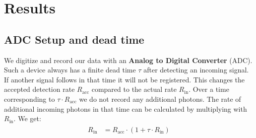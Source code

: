 \section*{Results}
%
\subsection*{ADC Setup and dead time}
%
We digitize and record our data with an \textbf{Analog to Digital Converter} (ADC).
Such a device always has a finite dead time $\tau$ after detecting an incoming signal.
If another signal follows in that time it will not be registered.
This changes the accepted detection rate $R_{\text{acc}}$ compared to the actual rate $R_{\text{in}}$.
Over a time corresponding to $\tau \cdot R_{\text{acc}}$ we do not record any additional photons.
The rate of additional incoming photons in that time can be calculated by multiplying with $R_{\text{in}}$.
We get:
\begin{align}
    \label{eq:DeadTime}
    \begin{split}
        R_{\text{in}} &= R_{\text{acc}} \cdot (1 + \tau \cdot R_{\text{in}} )
    \end{split}
\end{align}
%
